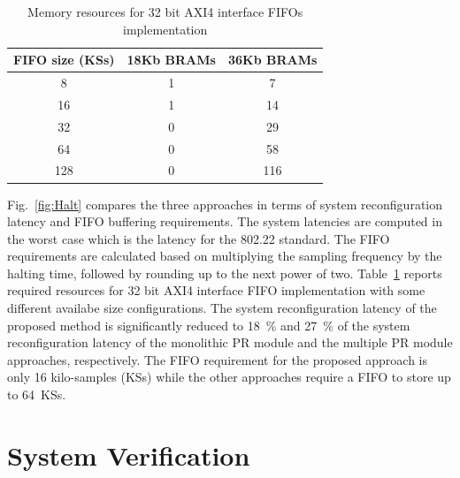 \begin{table}[hb]
	\centering
	\caption{Memory resources for 32 bit AXI4 interface FIFOs implementation}
	\label{tab:FIFOResouces}
	\begin{tabular}{c|c|c}
        \hline \hline
    			  FIFO size (KSs)&  18Kb BRAMs  & 36Kb BRAMs \\
	\hline
		8			& 1	&  7 \\
		16			& 1	&  14  \\
		32			& 0 	&  29 \\
		64	  		& 0  & 58 \\
		128	  		& 0	 & 116 \\
	\hline \hline
    \end{tabular}
\end{table}
Fig.~\ref{fig:Halt} compares the three approaches in terms of system reconfiguration latency and FIFO buffering requirements. The system latencies are computed in the worst case which is the latency for the 802.22 standard. The FIFO requirements are calculated based on multiplying the sampling frequency by the halting time, followed by rounding up to the next power of two.  Table~\ref{tab:FIFOResouces} reports
required resources for 32 bit AXI4 interface FIFO implementation with some different availabe size configurations.
The system reconfiguration latency of the proposed method is significantly reduced to 18~\% and 27~\% of the system reconfiguration latency of the monolithic PR module and the multiple PR module approaches, respectively. The FIFO requirement for the proposed approach is only 16 kilo-samples (KSs) while the other approaches require a FIFO to store up to 64~KSs.

\section{System Verification}
\label{sec:SysVer}


